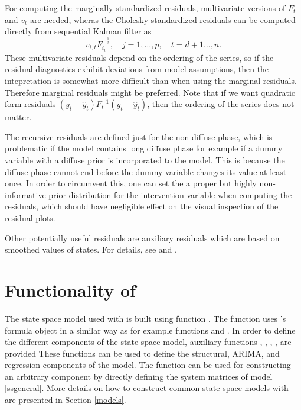 \documentclass[nojss,article]{jss}\usepackage[]{graphicx}\usepackage[]{color}
\begin{document}
For computing the marginally standardized residuals, multivariate versions of $F_t$ and $v_t$ are needed, wheras the Cholesky standardized residuals can be computed directly from sequential Kalman filter as 
\begin{equation*}
v_{i,t} F_{i_t}^{-\frac{1}{2}}, \quad j=1,\ldots,p,\quad t=d+1\ldots,n.
\end{equation*}
These multivariate residuals depend on the ordering of the series, so if the residual diagnostics exhibit deviations from model assumptions, then the intepretation is somewhat more difficult than when using the marginal residuals. Therefore marginal residuals might be preferred. Note that if we want quadratic form residuals $(y_t- \hat y_t)F_t^{-1}(y_t- \hat y_t)$, then the ordering of the series does not matter.

The recursive residuals are defined just for the non-diffuse phase, which is problematic if the model contains long diffuse phase for example if a dummy variable with a diffuse prior is incorporated to the model. This is because the diffuse phase cannot end before the dummy variable changes its value at least once. In order to circumvent this, one can set the a proper but highly non-informative prior distribution for the intervention variable when computing the residuals, which should have negligible effect on the visual inspection of the residual plots.

Other potentially useful residuals are auxiliary residuals which are based on smoothed values of states. For details, see \citet{HarveyKoopman1992} and \citet[Chapter 7]{DK2012}.

\section[Functionality of KFAS]{Functionality of }

The state space model used with  is built using function . The function uses 's formula object in a similar way as for example functions  and . In order to define the different components of the state space model, auxiliary functions , , , ,  are provided These functions can be used to define the structural, ARIMA, and regression components of the model. The function  can be used for constructing an arbitrary component by directly defining the system matrices of model \eqref{ssgeneral}. More details on how to construct common state space models with  are presented in Section \ref{models}.
\end{document}
